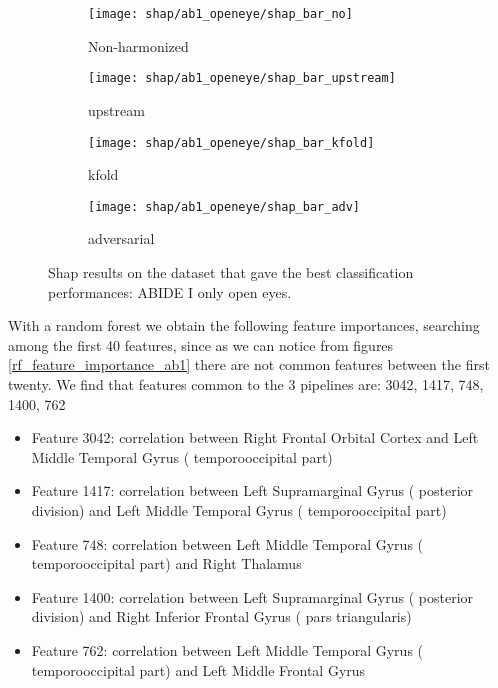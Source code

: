 \documentclass[a4paper,11pt]{article}
\begin{document}
\begin{figure}
\centering
\begin{subfigure}[b]{.45\textwidth}
   \texttt{[image: shap/ab1\_openeye/shap\_bar\_no]}
   \caption{Non-harmonized}
   \label{}
\end{subfigure}
\begin{subfigure}[b]{.45\textwidth}
   \texttt{[image: shap/ab1\_openeye/shap\_bar\_upstream]}
   \caption{upstream}
   \label{}
\end{subfigure}
\begin{subfigure}[b]{.45\textwidth}
   \texttt{[image: shap/ab1\_openeye/shap\_bar\_kfold]}
   \caption{kfold}
   \label{}
\end{subfigure}
\begin{subfigure}[b]{.45\textwidth}
   \texttt{[image: shap/ab1\_openeye/shap\_bar\_adv]}
   \caption{adversarial}
   \label{}
\end{subfigure}
\caption{Shap results on the dataset that gave the best classification performances: ABIDE I only open eyes.}
\label{fig:shap_ab1}
\end{figure}




With a random forest we obtain the following feature importances, searching among the first 40 features, since as we can notice from figures \ref{rf_feature_importance_ab1} there are not common features between the first twenty.
We find that features common to the 3 pipelines are: 3042, 1417, 748, 1400, 762


\begin{itemize}
\item Feature 3042: correlation between Right Frontal Orbital Cortex  and Left Middle Temporal Gyrus ( temporooccipital part)
\item Feature 1417: correlation between Left Supramarginal Gyrus ( posterior division) and Left Middle Temporal Gyrus ( temporooccipital part)
\item Feature 748: correlation between Left Middle Temporal Gyrus ( temporooccipital part) and Right Thalamus
\item Feature 1400: correlation between Left Supramarginal Gyrus ( posterior division) and Right Inferior Frontal Gyrus ( pars triangularis)
\item Feature 762: correlation between Left Middle Temporal Gyrus ( temporooccipital part) and Left Middle Frontal Gyrus
\end{itemize}
\end{document}
